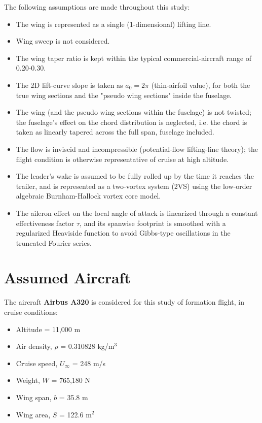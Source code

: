 \documentclass[11pt,a4paper]{article}
\begin{document}
The following assumptions are made throughout this study:

\begin{itemize}
\item The wing is represented as a single (1-dimensional) lifting line.
\item Wing sweep is not considered.
\item The wing taper ratio is kept within the typical commercial-aircraft range of 0.20-0.30.
\item The 2D lift-curve slope is taken as $a_0 = 2\pi$ (thin-airfoil value), for both the true wing sections and the "pseudo wing sections" inside the fuselage.
\item The wing (and the pseudo wing sections within the fuselage) is not twisted; the fuselage's effect on the chord distribution is neglected, i.e. the chord is taken as linearly tapered across the full span, fuselage included.
\item The flow is inviscid and incompressible (potential-flow lifting-line theory); the flight condition is otherwise representative of cruise at high altitude.
\item The leader's wake is assumed to be fully rolled up by the time it reaches the trailer, and is represented as a two-vortex system (2VS) using the low-order algebraic Burnham-Hallock vortex core model.
\item The aileron effect on the local angle of attack is linearized through a constant effectiveness factor $\tau$, and its spanwise footprint is smoothed with a regularized Heaviside function to avoid Gibbs-type oscillations in the truncated Fourier series.
\end{itemize}

\section{Assumed Aircraft}

The aircraft \textbf{Airbus A320} is considered for this study of formation flight, in cruise conditions:

\begin{itemize}
\item Altitude = 11,000 m
\item Air density, $\rho$ = 0.310828 kg/m$^3$
\item Cruise speed, $U_\infty$ = 248 m/s
\item Weight, $W$ = 765,180 N
\item Wing span, $b$ = 35.8 m
\item Wing area, $S$ = 122.6 m$^2$
\end{itemize}
\end{document}
